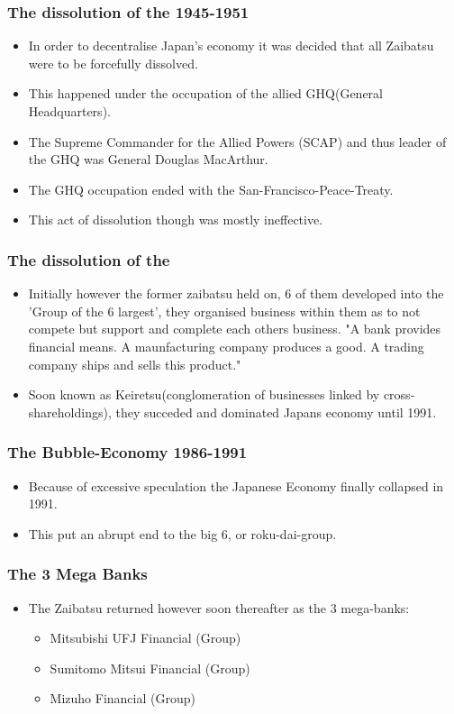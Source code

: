 \documentclass{article}
\newcommand\tabi[1][0.05cm]{\hspace*{#1}}
\begin{document}
\subsubsection{The dissolution of the  \tabi 1945-1951}
\begin{itemize}
\item In order to decentralise Japan's economy it was decided that all Zaibatsu were to be forcefully dissolved.
\item This happened under the occupation of the allied GHQ(General Headquarters).
\item The Supreme Commander for the Allied Powers (SCAP) and thus leader of the GHQ was General Douglas MacArthur.
\item The GHQ occupation ended with the San-Francisco-Peace-Treaty.
\item This act of dissolution though was mostly ineffective.
\end{itemize}
\subsubsection{The dissolution of the  }
\begin{itemize}
\item Initially however the former zaibatsu held on, 6 of them developed into the 'Group of the 6 largest', they organised business within them as to not compete but support and complete each others business. "A bank provides financial means. A maunfacturing company produces a good. A trading company ships and sells this product."
\item Soon known as Keiretsu(conglomeration of businesses linked by cross-shareholdings), they succeded and dominated Japans economy until 1991.
\end{itemize}
\subsubsection{The Bubble-Economy 1986-1991 }
\begin{itemize}
\item Because of excessive speculation the Japanese Economy finally collapsed in 1991.
\item This put an abrupt end to the big 6, or roku-dai-group.
\end{itemize}
\subsubsection{ The 3 Mega Banks  }
\begin{itemize}
\item The Zaibatsu returned however soon thereafter as the 3 mega-banks:
\begin{itemize}
\item Mitsubishi UFJ Financial (Group)
\item Sumitomo Mitsui Financial (Group)
\item Mizuho Financial (Group)
\end{itemize}
\end{itemize}
\end{document}
